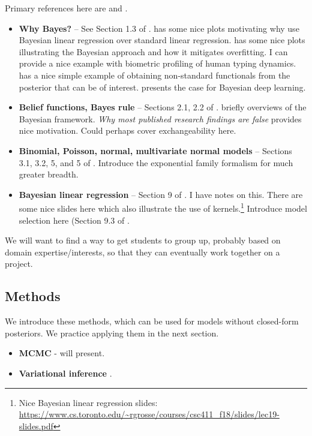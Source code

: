 \documentclass{article} %
\begin{document}
Primary references here are \cite{hoff2009first} and \cite{gelman2013bayesian}.

\begin{itemize}
\item \textbf{Why Bayes?} -- See Section 1.3 of \cite{hoff2009first}.   \cite{bishop2006pattern} has some nice plots motivating why use Bayesian linear regression over standard linear regression.   \cite{ghahramani2013bayesian}  has some nice plots illustrating the Bayesian approach and how it mitigates overfitting.   I can provide a nice example with biometric profiling of human typing dynamics.   \cite{held2006bayesian} has a nice simple example of obtaining non-standard functionals from the posterior that can be of interest.   \cite{wilson2020case} presents the case for Bayesian deep learning.  
\item \textbf{Belief functions,  Bayes rule} -- Sections 2.1,  2.2 of \cite{hoff2009first}.   \cite{ghahramani2013bayesian} briefly overviews of the Bayesian framework.  \textit{Why most published research findings are false} \cite{ioannidis2005most} provides nice motivation.    Could perhaps cover exchangeability here. 
\item \textbf{Binomial, Poisson, normal, multivariate normal models} -- Sections 3.1,  3.2, 5, and 5 of \cite{hoff2009first}.     Introduce the exponential family formalism \cite{wojnowiczXXXXexponential} for much greater breadth. 
\item \textbf{Bayesian linear regression} -- Section 9 of \cite{hoff2009first}.     I have notes on this.   There are some nice slides here which also illustrate the use of kernels.\footnote{Nice Bayesian linear regression slides: \url{https://www.cs.toronto.edu/~rgrosse/courses/csc411_f18/slides/lec19-slides.pdf}}   Introduce model selection here (Section 9.3 of \cite{hoff2009first}. 
\end{itemize}

We will want to find a way to get students to group up,  probably based on domain expertise/interests,  so that they can eventually work together on a project.  

\subsection{Methods}

We introduce these methods,  which can be used for models without closed-form posteriors.  We practice applying them in the next section.  

\begin{itemize}
\item \textbf{MCMC} -  will present.
\item \textbf{Variational inference} \cite{wojnowiczXXXXfoundations}.
\end{itemize} 
\end{document}
